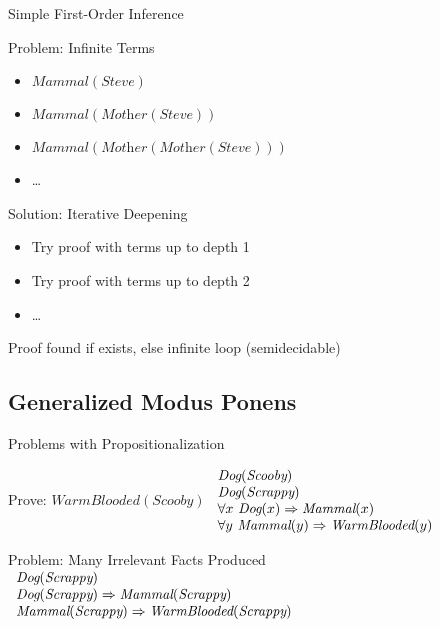 \documentclass[14pt]{beamer}
\begin{document}
\begin{frame}{Simple First-Order Inference}
	\begin{block}{Problem: Infinite Terms}
		\begin{itemize}
			\item $\textit{Mammal}(\textit{Steve})$
			\item $\textit{Mammal}(\textit{Mother}(\textit{Steve}))$
			\item $\textit{Mammal}(\textit{Mother}(\textit{Mother}(\textit{Steve})))$
			\item \ldots
		\end{itemize}
	\end{block}
	\pause
	\begin{block}{Solution: Iterative Deepening}
		\begin{itemize}
			\item Try proof with terms up to depth 1
			\item Try proof with terms up to depth 2
			\item \ldots
		\end{itemize}
		\pause
		Proof found if exists\pause, else infinite loop \pause (\alert{semidecidable})
	\end{block}
\end{frame}

\subsection{Generalized Modus Ponens}

\begin{frame}{Problems with Propositionalization}
	\begin{block}{Prove: $\textit{WarmBlooded}(\textit{Scooby})$}
		$
		\begin{array}{l}
			\textit{Dog}(\textit{Scooby}) \\
			\textit{Dog}(\textit{Scrappy}) \\
			\forall x\ \textit{Dog}(x) \Rightarrow \textit{Mammal}(x) \\
			\forall y\ \textit{Mammal}(y) \Rightarrow \textit{WarmBlooded}(y) \\
		\end{array}
		$
	\end{block}
	\begin{block}{Problem: Many Irrelevant Facts Produced}
		$
		\begin{array}{l}
			\textit{Dog}(\textit{Scrappy}) \\
			\textit{Dog}(\textit{Scrappy}) \Rightarrow \textit{Mammal}(\textit{Scrappy}) \\
			\textit{Mammal}(\textit{Scrappy}) \Rightarrow \textit{WarmBlooded}(\textit{Scrappy}) \\
		\end{array}
		$
	\end{block}
\end{frame}
\end{document}
